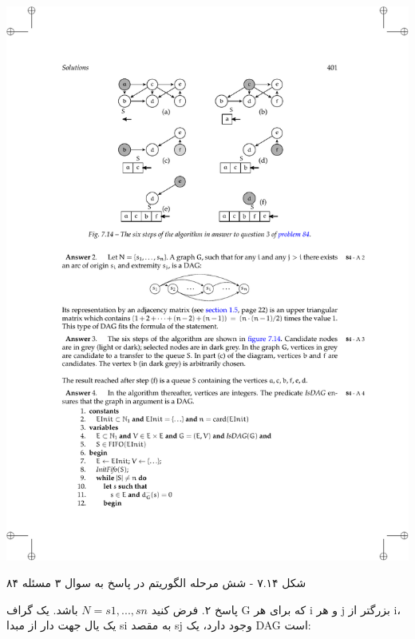 \documentclass{book} %
\newcommand{\imgcaption}[1]{\color[HTML]{4F4D4D}\footnotesize{#1}}
\begin{document}
\begin{center}
    \includegraphics{./f1.pdf}

    \imgcaption{شکل ۷.۱۴ - شش مرحله الگوریتم در پاسخ به سوال ۳ مسئله ۸۴}
\end{center}

پاسخ ۲. فرض کنید $N = {s1, ..., sn}$ باشد. یک گراف G که برای هر i و هر j بزرگتر از i، یک یال جهت دار از مبدا si به مقصد sj وجود دارد، یک DAG است:
\end{document}
